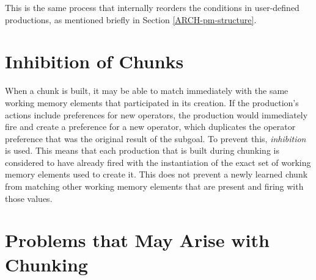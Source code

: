 This is the same process that internally reorders the conditions in
user-defined productions, as mentioned briefly in Section \ref{ARCH-pm-structure}. 


\section{Inhibition of Chunks}
\label{CHUNKING-inhibition}

When a chunk is built, it may be able to match immediately with the same
working memory elements that participated in its creation. If the production's
actions include preferences for new operators, the production would immediately
fire and create a preference for a new operator, which duplicates the 
operator preference
that was the original result of the subgoal. To prevent this,
\emph{inhibition} is used. This means that each production that is built 
during chunking is considered to have already fired with the instantiation of
the exact set of working memory elements used to create it. This does not
prevent a newly learned chunk from matching other working memory elements
that are present and firing with those values.


\section{Problems that May Arise with Chunking}
\label{CHUNKING-problems}



